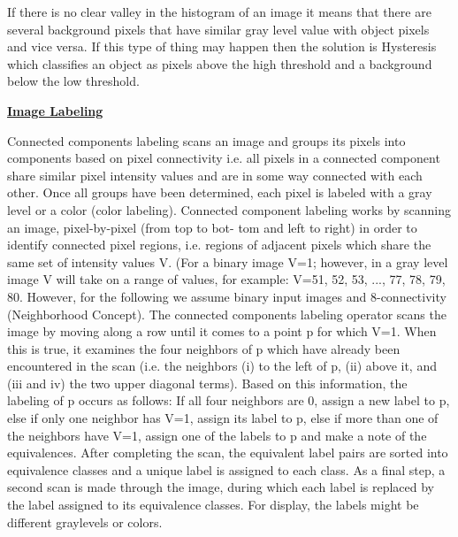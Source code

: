 \documentclass[10pt,a4paper]{article}
\begin{document}
If there is no clear valley in the histogram of an image it means that there are several background pixels that have similar gray level value with object pixels and vice versa. If this type of thing may happen then the solution is Hysteresis which classifies an object as pixels above the high threshold and a background below the low threshold.\\
\begin{center}
 \underline{\textbf{Image Labeling}}\\
\end{center}
Connected components labeling scans an image and groups its pixels into components based on pixel connectivity i.e. all pixels in a connected component share similar pixel intensity values and are in some way connected with each other. Once all groups have been determined, each pixel is labeled with a gray level or a color (color labeling). Connected component labeling works by scanning an image, pixel-by-pixel (from top to bot- tom and left to right) in order to identify connected pixel regions, i.e. regions of adjacent pixels which share the same set of intensity values V. (For a binary image V=1; however, in a gray level image V will take on a range of values, for example: V=51, 52, 53, ..., 77, 78, 79, 80. However, for the following we assume binary input images and 8-connectivity (Neighborhood Concept). The connected components labeling operator scans the image by moving along a row until it comes to a point p for which V=1. When this is true, it examines the four neighbors of p which have already been encountered in the scan (i.e. the neighbors (i) to the left of p, (ii) above it, and (iii and iv) the two upper diagonal terms). Based on this information, the labeling of p occurs as follows: If all four neighbors are 0, assign a new label to p, else if only one neighbor has V=1, assign its label to p, else if more than one of the neighbors have V=1, assign one of the labels to p and make a note of the equivalences. After completing the scan, the equivalent label pairs are sorted into equivalence classes and a unique label is assigned to each class. As a ﬁnal step, a second scan is made through the image, during which each label is replaced by the label assigned to its equivalence classes. For display, the labels might be diﬀerent graylevels or colors.\\
\end{document}
